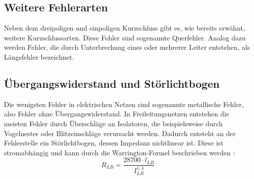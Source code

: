 \documentclass{scrartcl}
\begin{document}
\begin{onehalfspace}
\subsection{Weitere Fehlerarten}
Neben dem dreipoligen und einpoligen Kurzschluss gibt es, wie bereits erwähnt, weitere Kurzschlussarten. Diese Fehler sind sogenannte \glqq Querfehler\grqq{}. Analog dazu werden Fehler, die durch Unterbrechung eines oder mehrerer Leiter entstehen, als \glqq Längsfehler\grqq{} bezeichnet.

\subsection{Übergangswiderstand und Störlichtbogen}
Die wenigsten Fehler in elektrischen Netzen sind sogenannte \glqq metallische Fehler\grqq, also Fehler ohne Übergangswiderstand. In Freileitungsnetzen entstehen die meisten Fehler durch Überschläge an Isolatoren, die beispielsweise durch Vogelnester oder Blitzeinschläge verursacht werden. Dadurch entsteht an der Fehlerstelle ein Störlichtbogen, dessen Impedanz nichtlinear ist. Diese ist stromabhängig und kann durch die Warrington-Formel beschrieben werden \cite[S. 143]{Ziegler2008}: \\

\begin{equation}
R_{LB} = \frac{28700 \cdot l_{LB}}{I_{LB}^{1,4}}
\end{equation}


\end{onehalfspace}
\end{document}
